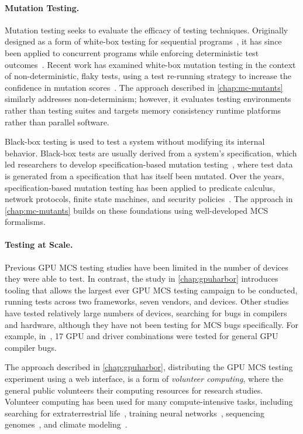 \paragraph{Mutation Testing.} Mutation testing seeks to evaluate the efficacy of testing techniques. Originally designed as a form of white-box testing for sequential programs~\cite{demillo1978hints}, it has since been applied to concurrent programs while enforcing deterministic test outcomes~\cite{carver1993mutation}. Recent work has examined white-box mutation testing in the context of non-deterministic, flaky tests, using a test re-running strategy to increase the confidence in mutation scores~\cite{shi2019flaky}. The approach described in \mychap\ref{chap:mc-mutants} similarly addresses non-determinism; however, it evaluates testing environments rather than testing suites and targets memory consistency runtime platforms rather than parallel software.

Black-box testing is used to test a system without modifying its internal behavior. Black-box tests are usually derived from a system's specification, which led researchers to develop specification-based mutation testing~\cite{budd1985specification}, where test data is generated from a specification that has itself been mutated. Over the years, specification-based mutation testing has been applied to predicate calculus, network protocols, finite state machines, and security policies~\cite{jia2011mutation}. The approach in \mychap\ref{chap:mc-mutants} builds on these foundations using well-developed MCS formalisms.

\paragraph{Testing at Scale.} Previous GPU MCS testing studies have been limited in the number of devices they were able to test. In contrast, the study in \mychap\ref{chap:gpuharbor} introduces tooling that allows the largest ever GPU MCS testing campaign to be conducted, running tests across two frameworks, seven vendors, and \totalDevices devices. Other studies have tested relatively large numbers of devices, searching for bugs in compilers and hardware, although they have not been testing for MCS bugs specifically. For example, in~\cite{donaldson2017graphicsfuzz}, 17 GPU and driver combinations were tested for general GPU compiler bugs.

The approach described in \mychap\ref{chap:gpuharbor}, distributing the GPU MCS testing experiment using a web interface, is a form of \textit{volunteer computing}, where the general public volunteers their computing resources for research studies. Volunteer computing has been used for many compute-intensive tasks, including searching for extraterrestrial life~\cite{anderson2002seti}, training neural networks~\cite{desell2017large}, sequencing genomes~\cite{pellicer2005gene}, and climate modeling~\cite{christensen2005challenge}.

